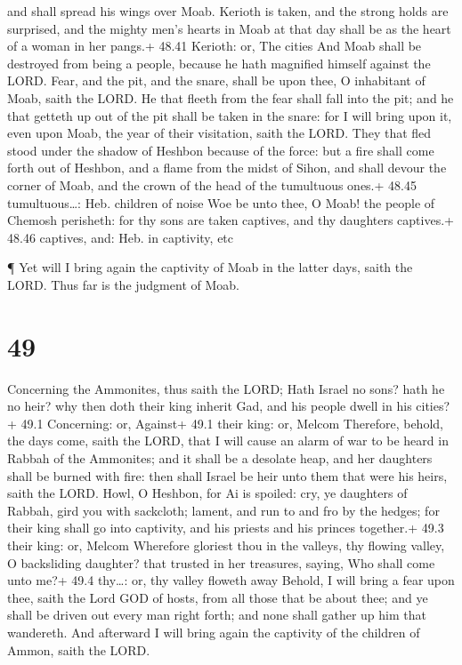 and shall spread his wings over Moab.  Kerioth is taken,
and the strong holds are surprised, and the mighty men's hearts in Moab
at that day shall be as the heart of a woman in her pangs.+ 48.41
Kerioth: or, The cities  And Moab shall be destroyed from
being a people, because he hath magnified himself against the LORD.
 Fear, and the pit, and the snare, shall be upon thee, O
inhabitant of Moab, saith the LORD.  He that fleeth from
the fear shall fall into the pit; and he that getteth up out of the pit
shall be taken in the snare: for I will bring upon it, even upon Moab,
the year of their visitation, saith the LORD.  They that
fled stood under the shadow of Heshbon because of the force: but a fire
shall come forth out of Heshbon, and a flame from the midst of Sihon,
and shall devour the corner of Moab, and the crown of the head of the
tumultuous ones.+ 48.45 tumultuous\ldots: Heb. children of noise
 Woe be unto thee, O Moab! the people of Chemosh perisheth:
for thy sons are taken captives, and thy daughters captives.+ 48.46
captives, and: Heb. in captivity, etc

 ¶ Yet will I bring again the captivity of Moab in the
latter days, saith the LORD. Thus far is the judgment of Moab.

\hypertarget{section-48}{%
\section{49}\label{section-48}}

 Concerning the Ammonites, thus saith the LORD; Hath Israel
no sons? hath he no heir? why then doth their king inherit Gad, and his
people dwell in his cities?+ 49.1 Concerning: or, Against+ 49.1 their
king: or, Melcom  Therefore, behold, the days come, saith
the LORD, that I will cause an alarm of war to be heard in Rabbah of the
Ammonites; and it shall be a desolate heap, and her daughters shall be
burned with fire: then shall Israel be heir unto them that were his
heirs, saith the LORD.  Howl, O Heshbon, for Ai is spoiled:
cry, ye daughters of Rabbah, gird you with sackcloth; lament, and run to
and fro by the hedges; for their king shall go into captivity, and his
priests and his princes together.+ 49.3 their king: or, Melcom
 Wherefore gloriest thou in the valleys, thy flowing valley,
O backsliding daughter? that trusted in her treasures, saying, Who shall
come unto me?+ 49.4 thy\ldots: or, thy valley floweth away 
Behold, I will bring a fear upon thee, saith the Lord GOD of hosts, from
all those that be about thee; and ye shall be driven out every man right
forth; and none shall gather up him that wandereth.  And
afterward I will bring again the captivity of the children of Ammon,
saith the LORD.

